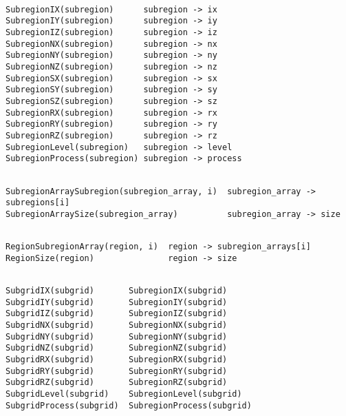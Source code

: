 {\newpage\clearpage
{}%
\begin{display}\begin{verbatim}

SubregionIX(subregion)      subregion -> ix
SubregionIY(subregion)      subregion -> iy
SubregionIZ(subregion)      subregion -> iz
SubregionNX(subregion)      subregion -> nx
SubregionNY(subregion)      subregion -> ny
SubregionNZ(subregion)      subregion -> nz
SubregionSX(subregion)      subregion -> sx
SubregionSY(subregion)      subregion -> sy
SubregionSZ(subregion)      subregion -> sz
SubregionRX(subregion)      subregion -> rx
SubregionRY(subregion)      subregion -> ry
SubregionRZ(subregion)      subregion -> rz
SubregionLevel(subregion)   subregion -> level
SubregionProcess(subregion) subregion -> process\end{verbatim}
\end{display}%
\lthtmlfigureZ
\lthtmlcheckvsize\clearpage}

{\newpage\clearpage
{}%
\begin{display}\begin{verbatim}

SubregionArraySubregion(subregion_array, i)  subregion_array -> subregions[i]
SubregionArraySize(subregion_array)          subregion_array -> size\end{verbatim}
\end{display}%
\lthtmlfigureZ
\lthtmlcheckvsize\clearpage}

{\newpage\clearpage
{}%
\begin{display}\begin{verbatim}

RegionSubregionArray(region, i)  region -> subregion_arrays[i]
RegionSize(region)               region -> size\end{verbatim}
\end{display}%
\lthtmlfigureZ
\lthtmlcheckvsize\clearpage}

{\newpage\clearpage
{}%
\begin{display}\begin{verbatim}

SubgridIX(subgrid)       SubregionIX(subgrid)
SubgridIY(subgrid)       SubregionIY(subgrid)
SubgridIZ(subgrid)       SubregionIZ(subgrid)
SubgridNX(subgrid)       SubregionNX(subgrid)
SubgridNY(subgrid)       SubregionNY(subgrid)
SubgridNZ(subgrid)       SubregionNZ(subgrid)
SubgridRX(subgrid)       SubregionRX(subgrid)
SubgridRY(subgrid)       SubregionRY(subgrid)
SubgridRZ(subgrid)       SubregionRZ(subgrid)
SubgridLevel(subgrid)    SubregionLevel(subgrid)
SubgridProcess(subgrid)  SubregionProcess(subgrid)\end{verbatim}
\end{display}%
\lthtmlfigureZ
\lthtmlcheckvsize\clearpage}

